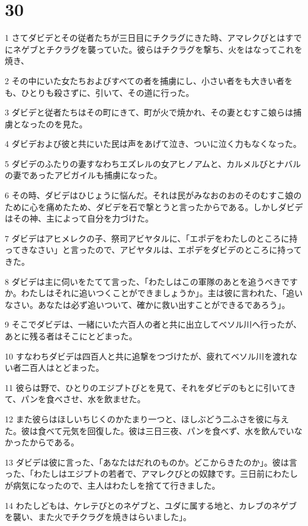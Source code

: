 \chapter{30}

\par 1 さてダビデとその従者たちが三日目にチクラグにきた時、アマレクびとはすでにネゲブとチクラグを襲っていた。彼らはチクラグを撃ち、火をはなってこれを焼き、
\par 2 その中にいた女たちおよびすべての者を捕虜にし、小さい者をも大きい者をも、ひとりも殺さずに、引いて、その道に行った。
\par 3 ダビデと従者たちはその町にきて、町が火で焼かれ、その妻とむすこ娘らは捕虜となったのを見た。
\par 4 ダビデおよび彼と共にいた民は声をあげて泣き、ついに泣く力もなくなった。
\par 5 ダビデのふたりの妻すなわちエズレルの女アヒノアムと、カルメルびとナバルの妻であったアビガイルも捕虜になった。
\par 6 その時、ダビデはひじょうに悩んだ。それは民がみなおのおのそのむすこ娘のために心を痛めたため、ダビデを石で撃とうと言ったからである。しかしダビデはその神、主によって自分を力づけた。
\par 7 ダビデはアヒメレクの子、祭司アビヤタルに、「エポデをわたしのところに持ってきなさい」と言ったので、アビヤタルは、エポデをダビデのところに持ってきた。
\par 8 ダビデは主に伺いをたてて言った、「わたしはこの軍隊のあとを追うべきですか。わたしはそれに追いつくことができましょうか」。主は彼に言われた、「追いなさい。あなたは必ず追いついて、確かに救い出すことができるであろう」。
\par 9 そこでダビデは、一緒にいた六百人の者と共に出立してベソル川へ行ったが、あとに残る者はそこにとどまった。
\par 10 すなわちダビデは四百人と共に追撃をつづけたが、疲れてベソル川を渡れない者二百人はとどまった。
\par 11 彼らは野で、ひとりのエジプトびとを見て、それをダビデのもとに引いてきて、パンを食べさせ、水を飲ませた。
\par 12 また彼らはほしいちじくのかたまり一つと、ほしぶどう二ふさを彼に与えた。彼は食べて元気を回復した。彼は三日三夜、パンを食べず、水を飲んでいなかったからである。
\par 13 ダビデは彼に言った、「あなたはだれのものか。どこからきたのか」。彼は言った、「わたしはエジプトの若者で、アマレクびとの奴隷です。三日前にわたしが病気になったので、主人はわたしを捨てて行きました。
\par 14 わたしどもは、ケレテびとのネゲブと、ユダに属する地と、カレブのネゲブを襲い、また火でチクラグを焼きはらいました」。
